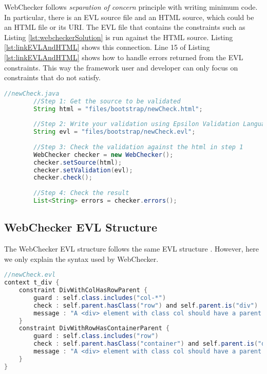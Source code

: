 \documentclass[conference]{IEEETran}
\begin{document}
WebChecker follows \textit{separation of concern} principle with writing minimum code. In particular, there is an EVL source file and an HTML source, which could be an HTML file or its URI. The EVL file that contains the constraints such as Listing \ref{lst:webcheckerSolution} is run against the HTML source. Listing \ref{lst:linkEVLAndHTML} shows this connection. Line 15 of Listing \ref{lst:linkEVLAndHTML} shows how to handle errors returned from the EVL constraints. This way the framework user and developer can only focus on constraints that do not satisfy.   

\begin{lstlisting}[language=Java, caption=Checking an EVL file against an HTML source file, label={lst:linkEVLAndHTML}]
 	//newCheck.java    
		//Step 1: Get the source to be validated
		String html = "files/bootstrap/newCheck.html";
		
		//Step 2: Write your validation using Epsilon Validation Language
		String evl = "files/bootstrap/newCheck.evl";
		
		//Step 3: Check the validation against the html in step 1
		WebChecker checker = new WebChecker();
		checker.setSource(html);
		checker.setValidation(evl);
		checker.check();
		
		//Step 4: Check the result
		List<String> errors = checker.errors();


\end{lstlisting}

\subsection{WebChecker EVL Structure}
The WebChecker EVL structure follows the same EVL structure \cite{Kolovos2009}. However, here we only explain the syntax used by WebChecker. 


\begin{lstlisting}[language=Java, caption=Enforcing Bootstrap Grid Rule by Using WebChecker, label={lst:webcheckerSolution}]
//newCheck.evl
context t_div { 
    constraint DivWithColHasRowParent {
        guard : self.class.includes("col-*")
        check : self.parent.hasClass("row") and self.parent.is("div")
        message : "A <div> element with class col should have a parent <div> element with class row."
    }
    constraint DivWithRowHasContainerParent {
        guard : self.class.includes("row")
        check : self.parent.hasClass("container") and self.parent.is("div")
        message : "A <div> element with class col should have a parent <div> element with class row."
    }
}

\end{lstlisting}
\end{document}

